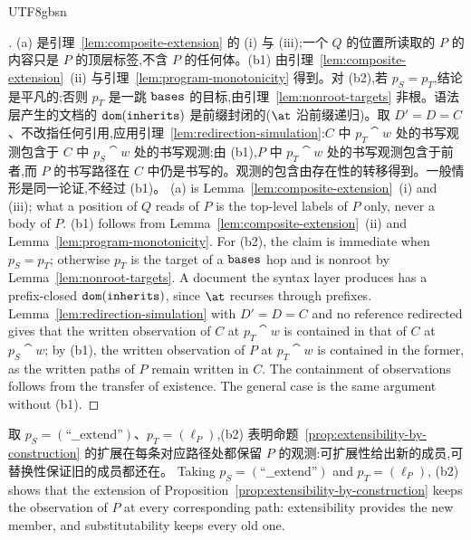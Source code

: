 \begin{CJK*}{UTF8}{gbsn}
\begin{proof}[]
\ifPaperChinese
(a) 是引理~\ref{lem:composite-extension} 的 (i) 与 (iii);一个 $Q$ 的位置所读取的 $P$ 的内容只是 $P$ 的顶层标签,不含 $P$ 的任何体。(b1) 由引理~\ref{lem:composite-extension}~(ii) 与引理~\ref{lem:program-monotonicity} 得到。对 (b2),若 $p_S = p_T$,结论是平凡的;否则 $p_T$ 是一跳 $\mathtt{bases}$ 的目标,由引理~\ref{lem:nonroot-targets} 非根。语法层产生的文档的 $\mathtt{dom}(\mathtt{inherits})$ 是前缀封闭的($\at$ 沿前缀递归)。取 $D' = D = C$、不改指任何引用,应用引理~\ref{lem:redirection-simulation}:$C$ 中 $p_T \cat w$ 处的书写观测包含于 $C$ 中 $p_S \cat w$ 处的书写观测;由 (b1),$P$ 中 $p_T \cat w$ 处的书写观测包含于前者,而 $P$ 的书写路径在 $C$ 中仍是书写的。观测的包含由存在性的转移得到。一般情形是同一论证,不经过 (b1)。
\else
(a) is Lemma~\ref{lem:composite-extension}~(i) and (iii); what a position of $Q$ reads of $P$ is the
top-level labels of $P$ only, never a body of $P$. (b1) follows from
Lemma~\ref{lem:composite-extension}~(ii) and Lemma~\ref{lem:program-monotonicity}. For (b2), the claim
is immediate when $p_S = p_T$; otherwise $p_T$ is the target of a $\mathtt{bases}$ hop and is nonroot by
Lemma~\ref{lem:nonroot-targets}. A document the syntax layer produces has a prefix-closed
$\mathtt{dom}(\mathtt{inherits})$, since $\at$ recurses through prefixes. Lemma~\ref{lem:redirection-simulation} with
$D' = D = C$ and no reference redirected gives that the written observation of $C$ at $p_T \cat w$ is
contained in that of $C$ at $p_S \cat w$; by (b1), the written observation of $P$ at $p_T \cat w$ is
contained in the former, as the written paths of $P$ remain written in $C$. The containment of
observations follows from the transfer of existence. The general case is the same argument without
(b1).
\fi
\end{proof}

\ifPaperChinese
取 $p_S = (\text{``\_\_extend''})$、$p_T = (\ell_P)$,(b2) 表明命题~\ref{prop:extensibility-by-construction} 的扩展在每条对应路径处都保留 $P$ 的观测:可扩展性给出新的成员,可替换性保证旧的成员都还在。
\else
Taking $p_S = (\text{``\_\_extend''})$ and $p_T = (\ell_P)$, (b2) shows that the extension of
Proposition~\ref{prop:extensibility-by-construction} keeps the observation of $P$ at every
corresponding path: extensibility provides the new member, and substitutability keeps every old one.
\fi


\end{CJK*}

